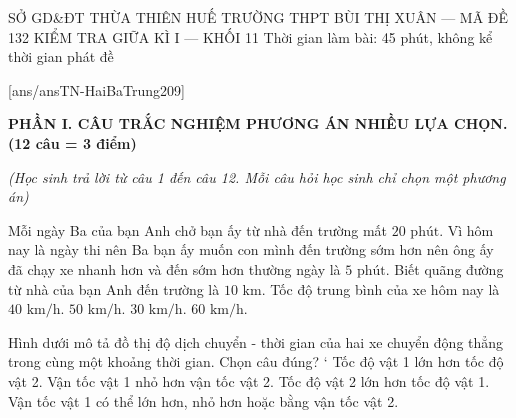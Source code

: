 \def\toanlop{10}
\def\thoigian{45}
\def\namhoc{2024 - 2025}
\begin{dethi}
	{SỞ GD\&ĐT THỪA THIÊN HUẾ}
	{TRƯỜNG THPT BÙI THỊ XUÂN --- MÃ ĐỀ 132}
	{KIỂM TRA GIỮA KÌ I --- KHỐI 11}
	{Thời gian làm bài: 45 phút, không kể thời gian phát đề}
\end{dethi}

[ans/ansTN-HaiBaTrung209]

\noindent \textbf{PHẦN I. CÂU TRẮC NGHIỆM PHƯƠNG ÁN NHIỀU LỰA CHỌN. (12 câu = 3 điểm)}

\noindent \textit{(Học sinh trả lời từ câu 1 đến câu 12. Mỗi câu hỏi học sinh chỉ chọn một phương án)}
\vspace{0.2cm}

\begin{ex}%
	Mỗi ngày Ba của bạn Anh chở bạn ấy từ nhà đến trường mất $20\text{ phút}$. Vì hôm nay là ngày thi nên Ba bạn ấy muốn con mình đến trường sớm hơn nên ông ấy đã chạy xe nhanh hơn và đến sớm hơn thường ngày là $5\text{ phút}$. Biết quãng đường từ nhà của bạn Anh đến trường là $10\text{ km}$. Tốc độ trung bình của xe hôm nay là
	\choice
	{\True $40\text{ km/h}$.}
	{$50\text{ km/h}$.}
	{$30\text{ km/h}$.}
	{$60\text{ km/h}$.}
\end{ex}

\begin{ex}%
	Hình dưới mô tả đồ thị độ dịch chuyển - thời gian của hai xe chuyển động thẳng trong cùng một khoảng thời gian. Chọn câu đúng?
`
	\choice
	{\True Tốc độ vật 1 lớn hơn tốc độ vật 2.}
	{Vận tốc vật 1 nhỏ hơn vận tốc vật 2.}
	{Tốc độ vật 2 lớn hơn tốc độ vật 1.}
	{Vận tốc vật 1 có thể lớn hơn, nhỏ hơn hoặc bằng vận tốc vật 2.}
\end{ex}


